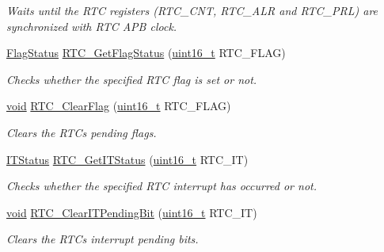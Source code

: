 \begin{DoxyCompactItemize}
\begin{DoxyCompactList}\small\item\em Waits until the R\+TC registers (R\+T\+C\+\_\+\+C\+NT, R\+T\+C\+\_\+\+A\+LR and R\+T\+C\+\_\+\+P\+RL) are synchronized with R\+TC A\+PB clock. \end{DoxyCompactList}\item 
\hyperlink{agilefox_2library_2inc_2stm32f10x__type_8h_a89136caac2e14c55151f527ac02daaff}{Flag\+Status} \hyperlink{group___r_t_c___exported___functions_ga21a85e5f846cb4552d5e76420779f3f6}{R\+T\+C\+\_\+\+Get\+Flag\+Status} (\hyperlink{_p_e___types_8h_a1f1825b69244eb3ad2c7165ddc99c956}{uint16\+\_\+t} R\+T\+C\+\_\+\+F\+L\+AG)
\begin{DoxyCompactList}\small\item\em Checks whether the specified R\+TC flag is set or not. \end{DoxyCompactList}\item 
\hyperlink{usb__devapi_8h_afabf60e7f57651d6d595a02c75f07cd0}{void} \hyperlink{group___r_t_c___exported___functions_gacefb05730a77ffaa273c1ac3ade1a22f}{R\+T\+C\+\_\+\+Clear\+Flag} (\hyperlink{_p_e___types_8h_a1f1825b69244eb3ad2c7165ddc99c956}{uint16\+\_\+t} R\+T\+C\+\_\+\+F\+L\+AG)
\begin{DoxyCompactList}\small\item\em Clears the R\+TC\textquotesingle{}s pending flags. \end{DoxyCompactList}\item 
\hyperlink{agilefox_2library_2inc_2stm32f10x__type_8h_aacbd7ed539db0aacd973a0f6eca34074}{I\+T\+Status} \hyperlink{group___r_t_c___exported___functions_ga23274ad8aa28e86d5b0d58eee295db21}{R\+T\+C\+\_\+\+Get\+I\+T\+Status} (\hyperlink{_p_e___types_8h_a1f1825b69244eb3ad2c7165ddc99c956}{uint16\+\_\+t} R\+T\+C\+\_\+\+IT)
\begin{DoxyCompactList}\small\item\em Checks whether the specified R\+TC interrupt has occurred or not. \end{DoxyCompactList}\item 
\hyperlink{usb__devapi_8h_afabf60e7f57651d6d595a02c75f07cd0}{void} \hyperlink{group___r_t_c___exported___functions_ga62b9a04d89a11f28db7dcfd50d9ee768}{R\+T\+C\+\_\+\+Clear\+I\+T\+Pending\+Bit} (\hyperlink{_p_e___types_8h_a1f1825b69244eb3ad2c7165ddc99c956}{uint16\+\_\+t} R\+T\+C\+\_\+\+IT)
\begin{DoxyCompactList}\small\item\em Clears the R\+TC\textquotesingle{}s interrupt pending bits. \end{DoxyCompactList}\end{DoxyCompactItemize}
